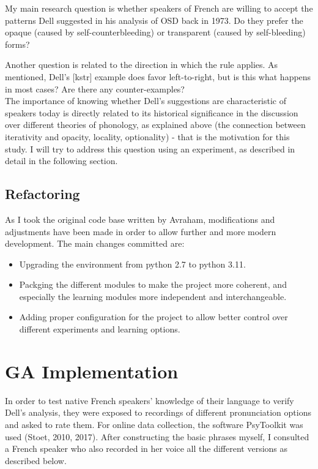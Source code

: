 \documentclass{article}
\begin{document}
My main research question is whether speakers of French are willing to accept the patterns Dell suggested in his analysis of OSD back in 1973.  Do they prefer the opaque (caused by self-counterbleeding) or transparent (caused by self-bleeding) forms?

Another question is related to the direction in which the rule applies. As mentioned,  Dell's [kstr] example does favor left-to-right, but is this what happens in most cases? Are there any counter-examples?\\

The importance of knowing whether Dell's suggestions are characteristic of speakers today is directly related to its historical significance in the discussion over different theories of phonology,  as explained above (the connection between iterativity and opacity, locality, optionality) - that is the motivation for this study. I will try to address this question using an experiment, as described in detail in the following section.

\clearpage
\subsection{Refactoring}
As I took the original code base written by Avraham, modifications and adjustments have been made in order to allow further and more modern development. The main changes committed are:
\begin{itemize}
  \item Upgrading the environment from python 2.7 to python 3.11.
  \item Packging the different modules to make the project more coherent, and especially the learning modules more independent and interchangeable.
  \item Adding proper configuration for the project to allow better control over different experiments and learning options.
\end{itemize}

\section{GA Implementation} 
In order to test native French speakers' knowledge of their language to verify Dell's analysis, they were exposed to recordings of different pronunciation options and asked to rate them.  For online data collection,  the software PsyToolkit was used (Stoet, 2010, 2017). After constructing the basic phrases myself, I consulted a French speaker who also recorded in her voice all the different versions as described below. 
\end{document}

